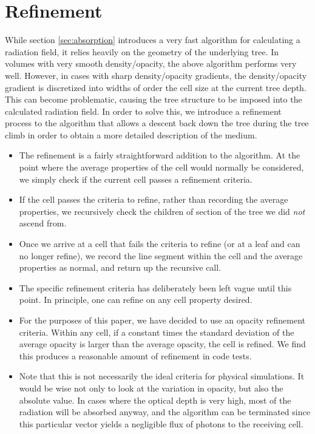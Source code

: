 \section{Refinement}
\label{sec:refinement}

While section \ref{sec:absorption} introduces a very fast algorithm for calculating a radiation field, it relies heavily on the geometry of the underlying tree. In volumes with very smooth density/opacity, the above algorithm performs very well. However, in cases with sharp density/opacity gradients, the density/opacity gradient is discretized into widths of order the cell size at the current tree depth. This can become problematic, causing the tree structure to be imposed into the calculated radiation field. In order to solve this, we introduce a refinement process to the algorithm that allows a descent back down the tree during the tree climb in order to obtain a more detailed description of the medium.

\begin{itemize}
\item The refinement is a fairly straightforward addition to the algorithm. At the point where the average properties of the cell would normally be considered, we simply check if the current cell passes a refinement criteria.
\item If the cell passes the criteria to refine, rather than recording the average properties, we recursively check the children of section of the tree we did \emph{not} ascend from.
\item Once we arrive at a cell that fails the criteria to refine (or at a leaf and can no longer refine), we record the line segment within the cell and the average properties as normal, and return up the recursive call.
\item The specific refinement criteria has deliberately been left vague until this point. In principle, one can refine on any cell property desired.
\item For the purposes of this paper, we have decided to use an opacity refinement criteria. Within any cell, if a constant times the standard deviation of the average opacity is larger than the average opacity, the cell is refined. We find this produces a reasonable amount of refinement in code tests.
\item Note that this is not necessarily the ideal criteria for physical simulations. It would be wise not only to look at the variation in opacity, but also the absolute value. In cases where the optical depth is very high, most of the radiation will be absorbed anyway, and the algorithm can be terminated since this particular vector yields a negligible flux of photons to the receiving cell.
\end{itemize}

